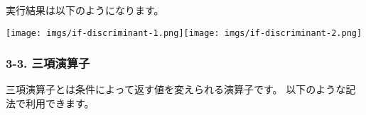 \begin{Shaded}
\begin{Highlighting}[]
\OperatorTok{,}\OperatorTok{,}\OperatorTok{;}
\OperatorTok{=} \OperatorTok{\textless{}}\OperatorTok{\textgreater{};}
\OperatorTok{=} \OperatorTok{\textless{}}\OperatorTok{\textgreater{};}
\OperatorTok{=} \OperatorTok{\textless{}}\OperatorTok{\textgreater{};}

\OperatorTok{=}\OperatorTok{**}  \OperatorTok{{-}}  \OperatorTok{*}\OperatorTok{*}\OperatorTok{;}

\OperatorTok{===} \NormalTok{) \{}
   \NormalTok{(}\NormalTok{)}\OperatorTok{;}
\NormalTok{\} } \OperatorTok{\textgreater{}} \NormalTok{) \{}
   \NormalTok{(}\NormalTok{)}\OperatorTok{;}
\NormalTok{\} }\NormalTok{ \{}
   \NormalTok{(}\NormalTok{)}\OperatorTok{;}
\NormalTok{\}}
\end{Highlighting}
\end{Shaded}

実行結果は以下のようになります。

\texttt{[image: imgs/if-discriminant-1.png]}\texttt{[image: imgs/if-discriminant-2.png]}

\subsubsection{3-3. 三項演算子}\label{ux4e09ux9805ux6f14ux7b97ux5b50}

三項演算子とは条件によって返す値を変えられる演算子です。
以下のような記法で利用できます。

\begin{Shaded}
\begin{Highlighting}[]
\OperatorTok{=} \OperatorTok{\textless{}}\OperatorTok{\textgreater{}}  \OperatorTok{\textless{}}\OperatorTok{\textgreater{}} \OperatorTok{:} \OperatorTok{\textless{}}\OperatorTok{\textgreater{};}
\end{Highlighting}
\end{Shaded}

